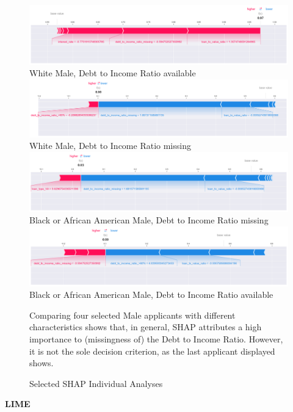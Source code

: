 \begin{figure}[h]
    \centering
    \includegraphics[width=1\textwidth]{images/SHAP_Individual_Analyses/SHAP_individual_0.png}
    \small
    White Male, Debt to Income Ratio available
    \includegraphics[width=1\textwidth]{images/SHAP_Individual_Analyses/SHAP_individual_1.png}
    \small
    White Male, Debt to Income Ratio missing
    \includegraphics[width=1\textwidth]{images/SHAP_Individual_Analyses/SHAP_individual_21.png}
    \small
    Black or African American Male, Debt to Income Ratio missing
    \includegraphics[width=1\textwidth]{images/SHAP_Individual_Analyses/SHAP_individual_139.png}
    \small
    Black or African American Male, Debt to Income Ratio available
    \caption{Selected SHAP Individual Analyses}
    \medskip
    \small
    Comparing four selected Male applicants with different characteristics shows that, in general, SHAP attributes a high importance to (missingness of) the Debt to Income Ratio. However, it is not the sole decision criterion, as the last applicant displayed shows.
    \label{fig:SHAP_Individual_Analyses}
\end{figure}

\textbf{LIME}


